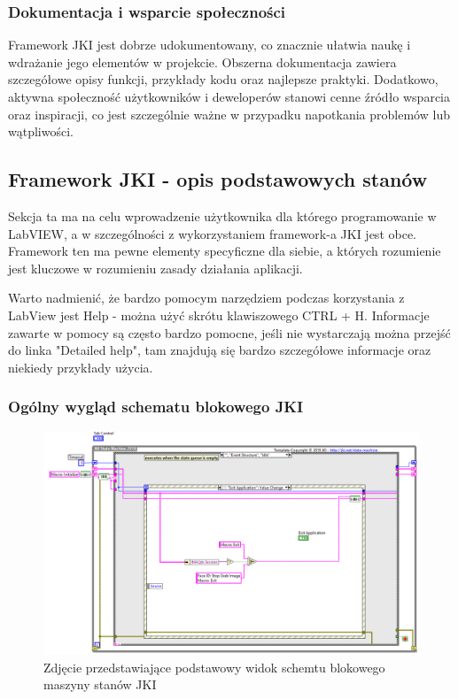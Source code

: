 \documentclass{report}
\begin{document}
\subsubsection*{Dokumentacja i wsparcie społeczności}

Framework JKI jest dobrze udokumentowany, co znacznie ułatwia naukę i wdrażanie jego elementów w projekcie. Obszerna dokumentacja zawiera szczegółowe opisy funkcji, przykłady kodu oraz najlepsze praktyki. Dodatkowo, aktywna społeczność użytkowników i deweloperów stanowi cenne źródło wsparcia oraz inspiracji, co jest szczególnie ważne w przypadku napotkania problemów lub wątpliwości.

\subsection{\Large Framework JKI - opis podstawowych stanów}
Sekcja ta ma na celu wprowadzenie użytkownika dla którego programowanie w LabVIEW, a w szczególności z wykorzystaniem framework-a JKI jest obce. 
Framework ten ma pewne elementy specyficzne dla siebie, a których rozumienie jest kluczowe w rozumieniu zasady działania aplikacji. 

Warto nadmienić, że bardzo pomocym narzędziem podczas korzystania z LabView jest Help - można użyć skrótu klawiszowego CTRL + H. 
Informacje zawarte w pomocy są często bardzo pomocne, jeśli nie wystarczają można przejść do linka "Detailed help", tam znajdują się bardzo szczegółowe informacje oraz niekiedy przykłady użycia.

\subsubsection{\large Ogólny wygląd schematu blokowego JKI}

\begin{figure} [H]
    \centering
    \includegraphics[width=1.0\textwidth]{"src/jki-main.png"}
    \caption{Zdjęcie przedstawiające podstawowy widok schemtu blokowego maszyny stanów JKI}
    \label{fig:foto1}
\end{figure}
\end{document}
